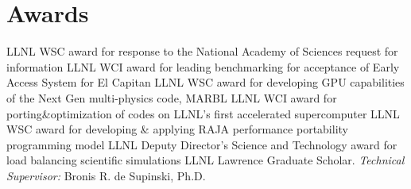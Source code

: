 \section{Awards}

	{LLNL WSC award for response to the National Academy of Sciences request for information}%
	{LLNL WCI award for leading benchmarking for acceptance of Early Access System for El Capitan}
	{LLNL WSC award for developing GPU capabilities of the Next Gen multi-physics code, MARBL}
	{LLNL WCI award for porting\&optimization of codes on LLNL's first accelerated supercomputer}%
	{LLNL WSC award for developing \& applying RAJA performance portability programming model}
       	{LLNL Deputy Director's Science and Technology award for load balancing scientific simulations}
	{LLNL Lawrence Graduate Scholar. {\em Technical Supervisor:} Bronis R. de Supinski, Ph.D.}
